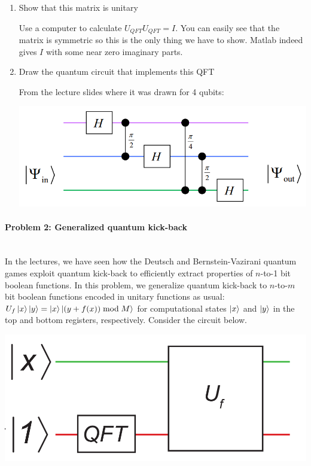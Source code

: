 \documentclass[12pt]{article}
\newenvironment{answer}{\begingroup\setlength{\leftskip}{-\leftmargin}\begin{framed}}{\end{framed}\endgroup}
\begin{document}
\begin{enumerate}
    \item Show that this matrix is unitary

    \begin{answer}
        Use a computer to calculate $U_{QFT}U_{QFT} = I$. You can easily see that the matrix is symmetric so this is the only thing we have to show.
        Matlab indeed gives $I$ with some near zero imaginary parts.
    \end{answer}

    \item Draw the quantum circuit that implements this QFT

    \begin{answer}
        From the lecture slides where it was drawn for 4 qubits:
        \begin{center}\includegraphics[width=.8\textwidth]{problem-1.png}\end{center}
    \end{answer}

\end{enumerate}

\paragraph{Problem 2: Generalized quantum kick-back} \hfill \\

In the lectures, we have seen how the Deutsch and Bernstein-Vazirani quantum games exploit quantum kick-back to efficiently extract properties of $n$-to-1 bit boolean functions. In this problem, we generalize quantum kick-back to $n$-to-$m$ bit boolean functions encoded in unitary functions as usual: $U_f\ket{x}\ket{y} = \ket{x}\ket{(y + f(x)) \bmod M}$ for computational states $\ket{x}$ and $\ket{y}$ in the top and bottom registers, respectively. Consider the circuit below.

\begin{center}\includegraphics[width=.5\textwidth]{problem-2.png}\end{center}
\end{document}
